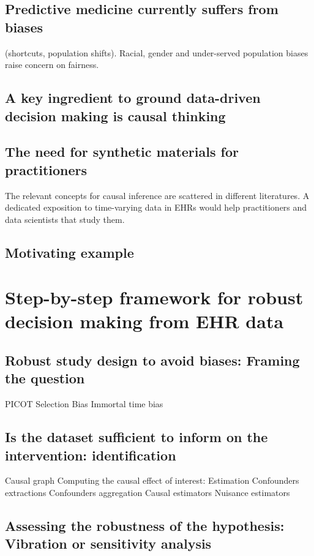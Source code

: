 \documentclass{report}
\begin{document}
\subsection{Predictive medicine currently suffers from
  biases}\label{subsec:causal_tuto:predictive_medicine_biases} (shortcuts,
population shifts). Racial, gender and under-served population biases raise
concern on fairness.
\subsection{A key ingredient to ground data-driven decision making is causal thinking}

\subsection{The need for synthetic materials for practitioners}\label{subsec:causal_tuto:synthetic_materials}

The relevant concepts for causal inference are scattered in different literatures. A dedicated exposition to time-varying data in EHRs would help practitioners and data scientists that study them.
\subsection{Motivating example}\label{subsec:causal_tuto:motivating_example}


\section{Step-by-step framework for robust decision making from EHR data}\label{sec:causal_tuto:framework}

\subsection{Robust study design to avoid biases: Framing the question}
PICOT
Selection Bias
Immortal time bias

\subsection{Is the dataset sufficient to inform on the intervention: identification}
Causal graph Computing the causal effect of interest: Estimation Confounders
extractions Confounders aggregation Causal estimators Nuisance estimators
\subsection{Assessing the robustness of the hypothesis: Vibration or sensitivity
  analysis}\label{subsec:causal_tuto:vibration_analysis}
\end{document}
